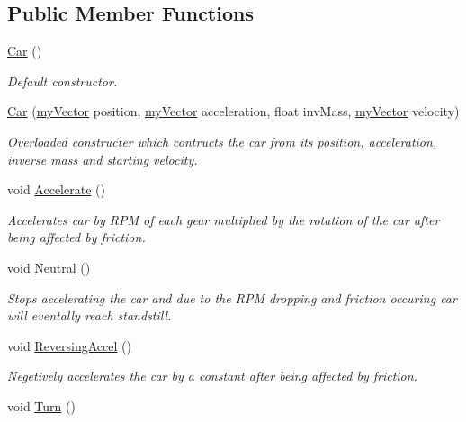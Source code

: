\subsection*{Public Member Functions}
\begin{DoxyCompactItemize}
\item 
\hyperlink{class_car_a1c803f7c5038d3e31b368b0d0a35493c}{Car} ()
\begin{DoxyCompactList}\small\item\em Default constructor. \end{DoxyCompactList}\item 
\hyperlink{class_car_a41823a6e8deb3a08e8b1bb911ff44611}{Car} (\hyperlink{classmy_vector}{my\+Vector} position, \hyperlink{classmy_vector}{my\+Vector} acceleration, float inv\+Mass, \hyperlink{classmy_vector}{my\+Vector} velocity)
\begin{DoxyCompactList}\small\item\em Overloaded constructer which contructs the car from its position, acceleration, inverse mass and starting velocity. \end{DoxyCompactList}\item 
void \hyperlink{class_car_af40693325c1d0b50f9fd67a0fc8ace9b}{Accelerate} ()
\begin{DoxyCompactList}\small\item\em Accelerates car by R\+P\+M of each gear multiplied by the rotation of the car after being affected by friction. \end{DoxyCompactList}\item 
void \hyperlink{class_car_aa8a2aacbb529a44221893b4e2877b03b}{Neutral} ()
\begin{DoxyCompactList}\small\item\em Stops accelerating the car and due to the R\+P\+M dropping and friction occuring car will eventally reach standstill. \end{DoxyCompactList}\item 
void \hyperlink{class_car_afb8da2fa315e9bb953ec87fb23ddd653}{Reversing\+Accel} ()
\begin{DoxyCompactList}\small\item\em Negetively accelerates the car by a constant after being affected by friction. \end{DoxyCompactList}\item 
\hypertarget{class_car_ad3c6ba8be8f38d8a4fac3c11d2c851d5}{}void \hyperlink{class_car_ad3c6ba8be8f38d8a4fac3c11d2c851d5}{Turn} ()\label{class_car_ad3c6ba8be8f38d8a4fac3c11d2c851d5}


\end{DoxyCompactItemize}
